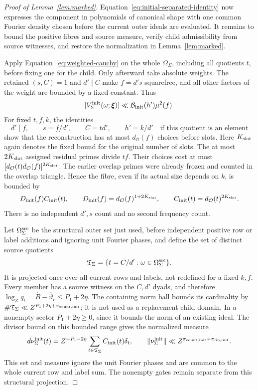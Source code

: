 \documentclass[12pt]{article}
\begin{document}
\begin{proof}[Proof of Lemma~\ref{lem:marked}]
Equation~\eqref{eq:initial-separated-identity} now expresses the component
in polynomials of canonical shape with one common Fourier density chosen
before the current outer ideals are evaluated.  It remains to bound the
positive fibres and source measure, verify child admissibility from source
witnesses, and restore the normalization in Lemma~\ref{lem:marked}.

Apply Equation~\eqref{eq:weighted-cauchy} on the whole
\(\Omega_\Sigma\), including all quotients \(t\), before fixing one
for the child.  Only afterward take absolute weights.  The retained
\((s,C)=1\) and \(d'\mid C\) make \(f=d's\) squarefree, and all
other factors of the weight are bounded by a fixed constant.  Thus
\[
 |V_\Sigma^{\rm init}(\omega;\boldsymbol\xi)|
 \ll\mathcal B_{\rm init}(h')\mu^2(f).
\]
For fixed \(t,f,k\), the identities
\[
 d'\mid f,\qquad s=f/d',\qquad C=td',\qquad h'=k/d'
       \quad\text{if this quotient is an element}
\]
show that the reconstruction has at most \(d_{\mathcal O}(f)\)
choices before slots.  Here \(K_{\rm slot}\) again denotes the fixed
bound for the original number of slots.  The at most \(2K_{\rm slot}\) assigned
residual primes divide \(tf\).  Their choices cost at most
\([d_{\mathcal O}(t)d_{\mathcal O}(f)]^{2K_{\rm slot}}\).
The earlier overlap primes were already frozen and counted in the
overlap triangle.  Hence the fibre, even if its actual size depends
on \(k\), is bounded by
\begin{equation}\label{eq:initial-fibre}
 D_{\rm init}(f)C_{\rm init}(t),\qquad
 D_{\rm init}(f)=d_{\mathcal O}(f)^{1+2K_{\rm slot}},\qquad
 C_{\rm init}(t)=d_{\mathcal O}(t)^{2K_{\rm slot}}.
\end{equation}
There is no independent \(d',s\) count and no second frequency count.

Let \(\Omega_\Sigma^{\rm src}\) be the structural outer set just
used, before independent positive row or label additions and ignoring
unit Fourier phases, and define the set of distinct source quotients
\[
 \mathfrak T_\Sigma=\{t=C/d':\omega\in\Omega_\Sigma^{\rm src}\}.
\]
It is projected once over all current rows and labels, not redefined
for a fixed \(k,f\).  Every member has a source witness on the
\(C,d'\) dyads, and therefore
\(\log_Zq_t=\widehat B-\widehat\vartheta_c\le P_1+2\eta\).
The containing norm ball bounds its cardinality by
\(\#\mathfrak T_\Sigma\ll Z^{P_1+2\eta+\pi_{{\rm count},{\rm init}}}\);
it is not used as a replacement child domain.  In a nonempty sector
\(P_1+2\eta\ge0\), since it bounds the norm of an existing ideal.
The divisor bound on this bounded range gives the normalized measure
\begin{equation}\label{eq:initial-normalized-quotients}
 d\nu_\Sigma^{\rm init}(t)
 =Z^{-P_1-2\eta}\sum_{t\in\mathfrak T_\Sigma}C_{\rm init}(t)\delta_t,
 \qquad
 \|\nu_\Sigma^{\rm init}\|
 \ll Z^{\pi_{{\rm count},{\rm init}}+\pi_{{\rm fib},{\rm init}}}.
\end{equation}
This set and measure ignore the unit Fourier phases and are common
to the whole current row and label sum.  The nonempty gates remain
separate from this structural projection.


\end{proof}
\end{document}
